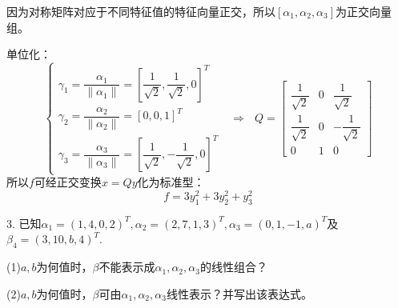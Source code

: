 \documentclass{article}
\begin{document}
\begin{jie}
因为对称矩阵对应于不同特征值的特征向量正交，所以$[\alpha_1,\alpha_2,\alpha_3]$为正交向量组。

单位化：
\begin{equation*}
\begin{cases}
\gamma_1=\dfrac{\alpha_1}{\|\alpha_1\|}=\left[\dfrac{1}{\sqrt{2}},\dfrac{1}{\sqrt{2}},0\right]^T\\[2mm]
\gamma_2=\dfrac{\alpha_2}{\|\alpha_2\|}=\left[0,0,1\right]^T\\[2mm]
\gamma_3=\dfrac{\alpha_3}{\|\alpha_3\|}=\left[\dfrac{1}{\sqrt{2}},-\dfrac{1}{\sqrt{2}},0\right]^T
\end{cases}~~~\Rightarrow~~~Q=
\begin{bmatrix}
\dfrac{1}{\sqrt{2}}&0&\dfrac{1}{\sqrt{2}}\\[2mm]
\dfrac{1}{\sqrt{2}}&0&-\dfrac{1}{\sqrt{2}}\\[2mm]
0&1&0
\end{bmatrix}
\end{equation*}
所以$f$可经正交变换$x=Qy$化为标准型：
\begin{equation*}
  f=3y_{1}^2+3y_{2}^2+y_{3}^2
\end{equation*}
\end{jie}

3. 已知$\alpha_ {1}=(1,4,0,2)^{T},\alpha_{2}=(2,7,1,3)^{T},\alpha_{3}=(0,1,-1,a)^{T}$及$\beta_{4}=(3,10,b,4)^{T}$.

(1)$a,b$为何值时，$\beta$不能表示成$\alpha_{1},\alpha_{2},\alpha_{3}$的线性组合？

(2)$a,b$为何值时，$\beta$可由$\alpha_{1},\alpha_{2},\alpha_{3}$线性表示？并写出该表达式。
\end{document}

